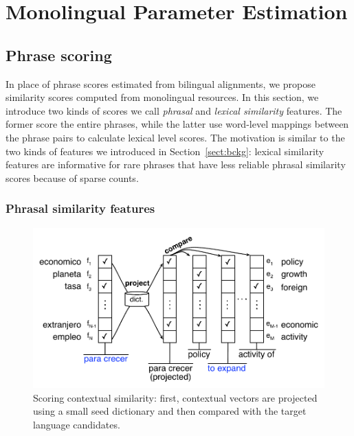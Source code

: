 \documentclass[11pt]{article}
\newcommand{\secref}[1]{Section~\ref{#1}}
\begin{document}

\section{Monolingual Parameter Estimation} \label{sect:mono}

\subsection{Phrase scoring} \label{sect:score}

In place of phrase scores estimated from bilingual alignments, we propose similarity scores computed  from monolingual resources.  In this section, we introduce two kinds of scores we call {\em phrasal} and {\em lexical similarity} features.  The former score the entire phrases, while the latter use word-level mappings between the phrase pairs to calculate lexical level scores.  The motivation is similar to the two kinds of features we introduced in \secref{sect:bckg}: lexical similarity features are informative for rare phrases that have less reliable phrasal similarity scores because of sparse counts. 

\subsubsection{Phrasal similarity features} \label{sect:phrasalfeats}

\begin{figure}
\includegraphics[width=\linewidth]{../figures/contextual/contextual}
\caption{Scoring contextual similarity: first, contextual vectors are projected using a small seed dictionary and then compared with the target language candidates.}
\label{fig:contextual}
\end{figure}
\end{document}
